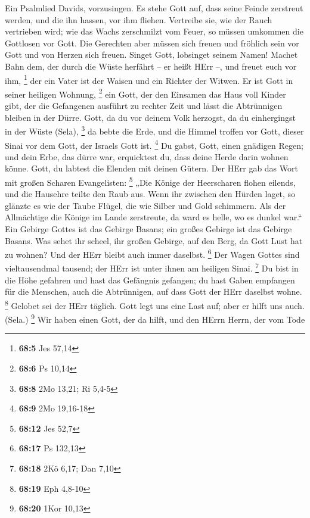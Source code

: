  Ein Psalmlied Davids, vorzusingen.  Es stehe
Gott auf, dass seine Feinde zerstreut werden, und die ihn hassen, vor
ihm fliehen.  Vertreibe sie, wie der Rauch vertrieben wird;
wie das Wachs zerschmilzt vom Feuer, so müssen umkommen die Gottlosen
vor Gott.  Die Gerechten aber müssen sich freuen und
fröhlich sein vor Gott und von Herzen sich freuen.  Singet
Gott, lobsinget seinem Namen! Machet Bahn dem, der durch die Wüste
herfährt -- er heißt HErr --, und freuet euch vor ihm, \footnote{\textbf{68:5}
  Jes 57,14}  der ein Vater ist der Waisen und ein Richter
der Witwen. Er ist Gott in seiner heiligen Wohnung, \footnote{\textbf{68:6}
  Ps 10,14}  ein Gott, der den Einsamen das Haus voll Kinder
gibt, der die Gefangenen ausführt zu rechter Zeit und lässt die
Abtrünnigen bleiben in der Dürre.  Gott, da du vor deinem
Volk herzogst, da du einhergingst in der Wüste (Sela), \footnote{\textbf{68:8}
  2Mo 13,21; Ri 5,4-5}  da bebte die Erde, und die Himmel
troffen vor Gott, dieser Sinai vor dem Gott, der Israels Gott ist.
\footnote{\textbf{68:9} 2Mo 19,16-18}  Du gabst, Gott,
einen gnädigen Regen; und dein Erbe, das dürre war, erquicktest du,
 dass deine Herde darin wohnen könne. Gott, du labtest die
Elenden mit deinen Gütern.  Der HErr gab das Wort mit
großen Scharen Evangelisten: \footnote{\textbf{68:12} Jes 52,7}
 „Die Könige der Heerscharen flohen eilends, und die
Hausehre teilte den Raub aus.  Wenn ihr zwischen den Hürden
laget, so glänzte es wie der Taube Flügel, die wie Silber und Gold
schimmern.  Als der Allmächtige die Könige im Lande
zerstreute, da ward es helle, wo es dunkel war.``  Ein
Gebirge Gottes ist das Gebirge Basans; ein großes Gebirge ist das
Gebirge Basans.  Was sehet ihr scheel, ihr großen Gebirge,
auf den Berg, da Gott Lust hat zu wohnen? Und der HErr bleibt auch immer
daselbst. \footnote{\textbf{68:17} Ps 132,13}  Der Wagen
Gottes sind vieltausendmal tausend; der HErr ist unter ihnen am heiligen
Sinai. \footnote{\textbf{68:18} 2Kö 6,17; Dan 7,10}  Du
bist in die Höhe gefahren und hast das Gefängnis gefangen; du hast Gaben
empfangen für die Menschen, auch die Abtrünnigen, auf dass Gott der HErr
daselbst wohne. \footnote{\textbf{68:19} Eph 4,8-10} 
Gelobet sei der HErr täglich. Gott legt uns eine Last auf; aber er hilft
uns auch. (Sela.) \footnote{\textbf{68:20} 1Kor 10,13}  Wir
haben einen Gott, der da hilft, und den HErrn Herrn, der vom Tode
